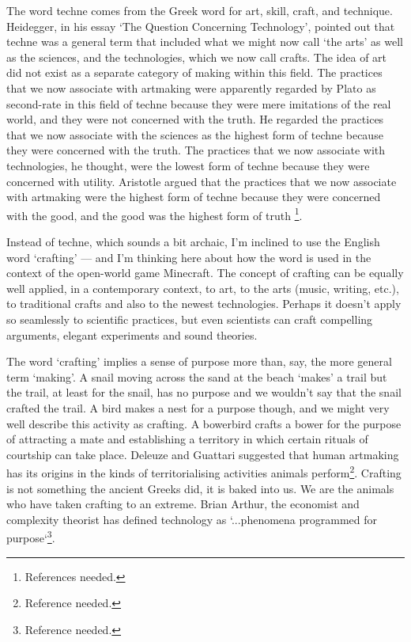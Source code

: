 \documentclass[letterpaper]{article}
\begin{document}
The word techne comes from the Greek word for art, skill, craft, and technique. Heidegger, in his essay ‘The Question Concerning Technology’, pointed out that techne was a general term that included what we might now call ‘the arts’ as well as the sciences, and the technologies, which we now call crafts. The idea of art did not exist as a separate category of making within this field. The practices that we now associate with artmaking were apparently regarded by Plato as second-rate in this field of techne because they were mere imitations of the real world, and they were not concerned with the truth. He regarded the practices that we now associate with the sciences as the highest form of techne because they were concerned with the truth. The practices that we now associate with technologies, he thought, were the lowest form of techne because they were concerned with utility. Aristotle argued that the practices that we now associate with artmaking were the highest form of techne because they were concerned with the good, and the good was the highest form of truth \footnote{References needed.}.

Instead of techne, which sounds a bit archaic, I'm inclined to use the English word ‘crafting’ — and I'm thinking here about how the word is used in the context of the open-world game Minecraft. The concept of crafting can be equally well applied, in a contemporary context, to art, to the arts (music, writing, etc.), to traditional crafts and also to the newest technologies. Perhaps it doesn't apply so seamlessly to scientific practices, but even scientists can craft compelling arguments, elegant experiments and sound theories.

The word ‘crafting’ implies a sense of purpose more than, say, the more general term ‘making’. A snail moving across the sand at the beach ‘makes’ a trail but the trail, at least for the snail, has no purpose and we wouldn't say that the snail crafted the trail. A bird makes a nest for a purpose though, and we might very well describe this activity as crafting. A bowerbird crafts a bower for the purpose of attracting a mate and establishing a territory in which certain rituals of courtship can take place. Deleuze and Guattari suggested that human artmaking has its origins in the kinds of territorialising activities animals perform\footnote{Reference needed.}. Crafting is not something the ancient Greeks did, it is baked into us. We are the animals who have taken crafting to an extreme. Brian Arthur, the economist and complexity theorist has defined technology as ‘...phenomena programmed for purpose‘\footnote{Reference needed.}. 
\end{document}
